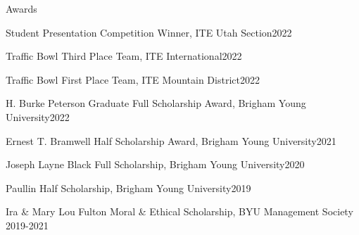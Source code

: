 \documentclass{resume} %
\begin{document}
\begin{rSection}{Awards}
\begin{esSubsection}{Student Presentation Competition Winner,}{ ITE Utah Section}{2022}{}{}
\end{esSubsection}
\begin{esSubsection}{Traffic Bowl Third Place Team,}{ ITE International}{2022}{}{}
\end{esSubsection}
\begin{esSubsection}{Traffic Bowl First Place Team,}{ ITE Mountain District}{2022}{}{}
\end{esSubsection}
\begin{esSubsection}{H. Burke Peterson Graduate Full Scholarship Award,}{ Brigham Young University}{2022}{}{}
\end{esSubsection}
\begin{esSubsection}{Ernest T. Bramwell Half Scholarship Award,}{ Brigham Young University}{2021}{}{}
\end{esSubsection}
\begin{esSubsection}{Joseph Layne Black Full Scholarship,}{ Brigham Young University}{2020}{}{}
\end{esSubsection}
\begin{esSubsection}{Paullin Half Scholarship,}{ Brigham Young University}{2019}{}{}
\end{esSubsection}
\begin{esSubsection}{Ira \& Mary Lou Fulton Moral \& Ethical Scholarship,}{ BYU Management Society}{ 2019-2021}{}{}
\end{esSubsection}
\end{rSection}



\end{document}
